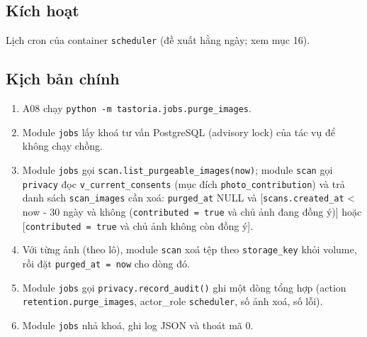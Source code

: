\subsection{Kích hoạt}
Lịch cron của container {\small\texttt{scheduler}} (đề xuất hằng ngày; xem mục 16).

\subsection{Kịch bản chính}
\begin{enumerate}
\item A08 chạy {\small\texttt{python -\allowbreak{}m tastoria.\allowbreak{}jobs.\allowbreak{}purge\_\allowbreak{}\allowbreak{}images}}.
\item Module {\small\texttt{jobs}} lấy khoá tư vấn PostgreSQL (advisory lock) của tác vụ để không chạy chồng.
\item Module {\small\texttt{jobs}} gọi {\small\texttt{scan.\allowbreak{}list\_\allowbreak{}\allowbreak{}purgeable\_\allowbreak{}\allowbreak{}images(now)}}; module {\small\texttt{scan}} gọi {\small\texttt{privacy}} đọc {\small\texttt{v\_\allowbreak{}\allowbreak{}current\_\allowbreak{}\allowbreak{}consents}} (mục đích {\small\texttt{photo\_\allowbreak{}\allowbreak{}contribution}}) và trả danh sách {\small\texttt{scan\_\allowbreak{}\allowbreak{}images}} cần xoá: {\small\texttt{purged\_\allowbreak{}\allowbreak{}at}} NULL và [{\small\texttt{scans.\allowbreak{}created\_\allowbreak{}\allowbreak{}at}} < now - 30 ngày và không ({\small\texttt{contributed = true}} và chủ ảnh đang đồng ý)] hoặc [{\small\texttt{contributed = true}} và chủ ảnh không còn đồng ý].
\item Với từng ảnh (theo lô), module {\small\texttt{scan}} xoá tệp theo {\small\texttt{storage\_\allowbreak{}\allowbreak{}key}} khỏi volume, rồi đặt {\small\texttt{purged\_\allowbreak{}\allowbreak{}at = now}} cho dòng đó.
\item Module {\small\texttt{jobs}} gọi {\small\texttt{privacy.\allowbreak{}record\_\allowbreak{}\allowbreak{}audit()}} ghi một dòng tổng hợp (action {\small\texttt{retention.\allowbreak{}purge\_\allowbreak{}\allowbreak{}images}}, actor\_\allowbreak{}role {\small\texttt{scheduler}}, số ảnh xoá, số lỗi).
\item Module {\small\texttt{jobs}} nhả khoá, ghi log JSON và thoát mã 0.
\end{enumerate}
